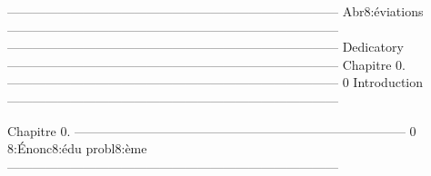 ------------------------------------------------------------------------------
 Abr8:é\endcsname viations
------------------------------------------------------------------------------
------------------------------------------------------------------------------
 Dedicatory
------------------------------------------------------------------------------
Chapitre 0.
------------------------------------------------------------------------------
 0 Introduction
------------------------------------------------------------------------------




















Chapitre 0.
------------------------------------------------------------------------------
 0 8:É\endcsname nonc8:é\endcsname  du probl8:è\endcsname me
------------------------------------------------------------------------------


